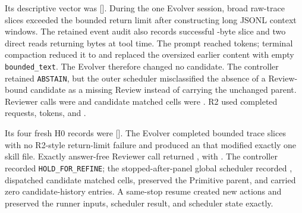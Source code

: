
 Its descriptive
vector was [\MiniRTwoHZeroVector{}]. During the one Evolver session,
\MiniRTwoTraceFailures{} broad raw-trace slices exceeded the bounded return
limit after constructing long JSONL context windows. The retained event audit
also records \MiniRTwoTraceSuccesses{} successful
\MiniRTwoTraceSuccessBytes{}-byte slice and two direct reads returning
\MiniRTwoDirectReadBytes{} bytes at tool time. The prompt reached
\MiniRTwoPreCompactionTokens{} tokens; terminal compaction reduced it to
\MiniRTwoPostCompactionTokens{} and replaced the oversized earlier content
with empty \texttt{bounded\_text}. The Evolver therefore changed no candidate.
The controller retained \texttt{ABSTAIN}, but the outer scheduler
misclassified the absence of a Review-bound candidate as a missing Review
instead of carrying the unchanged parent. Reviewer calls were
\MiniRTwoReviewerCalls{} and candidate matched cells were
\MiniRTwoCandidateCells{}. R2 used \MiniRTwoRequests{} completed requests,
\MiniRTwoTokens{} tokens, and \MiniRTwoCost{}.


 Its four fresh H0 records were
[\MiniRThreeHZeroVector{}]. The Evolver completed
\MiniRThreeTraceSlices{} bounded trace slices with no R2-style return-limit
failure and produced an \MiniRThreeProposal{} that modified exactly one skill
file. Exactly \MiniRThreeReviewerCalls{} answer-free Reviewer call returned
\MiniRThreeReview{}, with \MiniRThreeClaimReview{}. The controller recorded
\texttt{HOLD\_FOR\_REFINE}; the stopped-after-panel global scheduler recorded
\MiniRThreeStatus{}, dispatched \MiniRThreeCandidateCells{} candidate matched
cells, preserved the Primitive parent, and carried zero candidate-history
entries. A same-stop resume created \MiniRThreeResumeActions{} new actions and
preserved the runner inputs, scheduler result, and scheduler state exactly.

